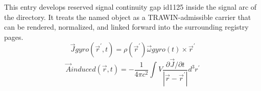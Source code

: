 
\begin{tzpsnapshot}
\end{tzpsnapshot}

This entry develops reserved signal continuity gap id1125 inside the signal arc of the directory. It treats the named object as a TRAWIN-admissible carrier that can be rendered, normalized, and linked forward into the surrounding registry pages.
\[
\vec{J} {gyro}(\vec{r}^{\prime},t) = \rho(\vec{r}^{\prime})\vec{\omega} {gyro}(t)\times\vec{r}^{\prime}
\]
\[
\vec{A} {induced}(\vec{r},t) = -\frac{1}{4\pi c^{2}}\int {V}\frac{\partial\vec{J}/\partial t}{|\vec{r}-\vec{r}^{\prime}|}d^{3}r^{\prime}
\]

